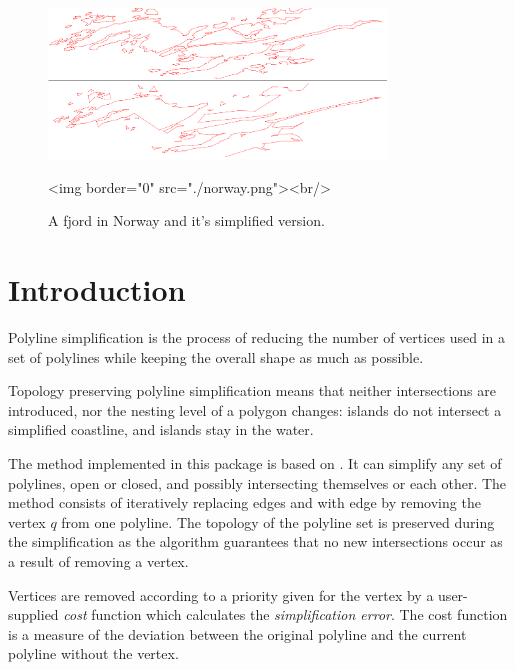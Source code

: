 \begin{figure}[ht]
\begin{center}
 \begin{ccTexOnly}

   \includegraphics[height=4cm]{Polyline_simplification_2/norway.png}

 \end{ccTexOnly}
 \begin{ccHtmlOnly}
   <img border="0" src="./norway.png"><br/>
 \end{ccHtmlOnly}
 \caption{A fjord in Norway and it's simplified version.}
  \label{figure:simplified_norway}
\end{center}
\end{figure}

\section{Introduction}
Polyline simplification is the process of reducing the
number of vertices used in a set of polylines while keeping the
overall shape as much as possible.


Topology preserving polyline simplification means that neither intersections are introduced, 
nor the nesting level of a polygon changes: islands do not intersect
a simplified coastline, and islands stay in the water.

The method implemented in this package is based on
\cite{cgal:dds-scs-09}.  It can simplify any set of polylines, open or
closed, and possibly intersecting themselves or each other. The method
consists of iteratively replacing edges  and  with edge
 by removing the vertex $q$ from one polyline. The topology of
the polyline set is preserved during the simplification as the
algorithm guarantees that no new intersections occur as a result of
removing a vertex.

Vertices are removed according to a priority given for the vertex by a user-supplied {\em cost} function which
calculates the {\em simplification error}. The cost function is a measure of the deviation between the original polyline
and the current polyline without the vertex.

